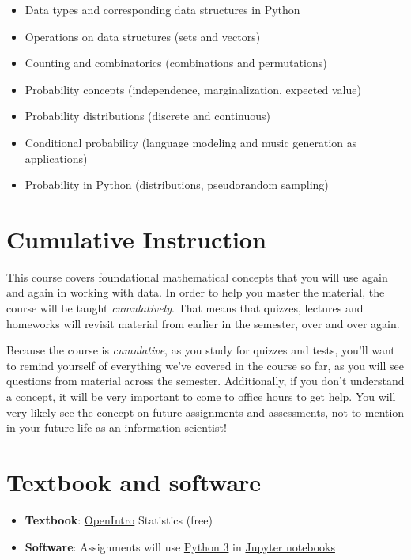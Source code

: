 \documentclass[10pt]{memoir}
\begin{document}
\begin{itemize}
\item Data types and corresponding data structures in Python
\item Operations on data structures (sets and vectors)
\item Counting and combinatorics (combinations and permutations)
\item Probability concepts (independence, marginalization, expected value)
\item Probability distributions (discrete and continuous)
\item Conditional probability (language modeling and music generation as applications)
\item Probability in Python (distributions, pseudorandom sampling)
\end{itemize}


\section{\textbf{Cumulative Instruction}}

This course covers foundational mathematical concepts that you will use again and again in working with data. In order to help you master the material, the course will be taught \textit{cumulatively}. That means that quizzes, lectures and homeworks will revisit material from earlier in the semester, over and over again. 

Because the course is \textit{cumulative}, as you study for quizzes and tests, you'll want to remind yourself of everything we've covered in the course so far, as you will see questions from material across the semester. Additionally, if you don't understand a concept, it will be very important to come to office hours to get help. You will very likely see the concept on future assignments and assessments, not to mention in your future life as an information scientist!

\section{Textbook and software }

\begin{itemize}
\item \textbf{Textbook}: \href{https://www.abehandler.com/resources/openintro-statistics.pdf}{OpenIntro} Statistics (free)
\item \textbf{Software}: Assignments will use \href{https://www.python.org/}{Python 3} in \href{https://jupyter.org/}{Jupyter notebooks}
\end{itemize}
\end{document}
